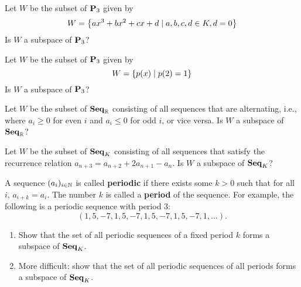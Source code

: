 \begin{ex}
  Let $W$ be the subset of\/ $\mathbf{P}_3$ given by
  \begin{equation*}
    W = \left\{ax^3 + bx^2 + cx + d \mid a,b,c,d \in K, d = 0\right\}
  \end{equation*}
  Is $W$ a subspace of $\mathbf{P}_3$?
\end{ex}

\begin{ex}
  Let $W$ be the subset of\/ $\mathbf{P}_3$ given by
  \begin{equation*}
    W = \left\{p(x) \mid p(2) = 1\right\}
  \end{equation*}
  Is $W$ a subspace of $\mathbf{P}_3$?
\end{ex}

\begin{ex}
  Let $W$ be the subset of $\mathbf{Seq}_{\mathbb{R}}$ consisting of all sequences
  that are alternating, i.e., where $a_i\geq 0$ for even $i$ and
  $a_i\leq 0$ for odd $i$, or vice versa. Is $W$ a subspace of
  $\mathbf{Seq}_{\mathbb{R}}$?
\end{ex}

\begin{ex}
  Let $W$ be the subset of $\mathbf{Seq}_K$ consisting of all sequences that
  satisfy the recurrence relation
  $a_{n+3} = a_{n+2} + 2a_{n+1} - a_n$. Is $W$ a subspace of
  $\mathbf{Seq}_K$?
\end{ex}

\begin{ex}\label{ex:periodic}
  A sequence $(a_i)_{i\in\mathbb{N}}$ is called \textbf{periodic}%
   if there exists some $k>0$ such that for
  all $i$, $a_{i+k}=a_i$. The number $k$ is called a \textbf{period}
  of the sequence. For example, the following is a periodic sequence
  with period $3$:
  \begin{equation*}
    (1,5,-7,1,5,-7,1,5,-7,1,5,-7,1,\ldots).
  \end{equation*}
  \begin{enumerate}
  \item Show that the set of all periodic sequences of a fixed period
    $k$ forms a subspace of $\mathbf{Seq}_K$.
  \item More difficult: show that the set of all periodic sequences of
    all periods forms a subspace of $\mathbf{Seq}_K$.
  \end{enumerate}
\end{ex}

